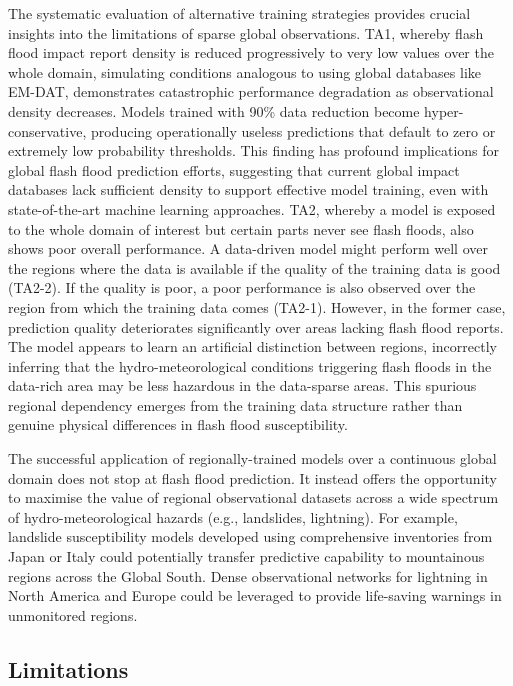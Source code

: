 The systematic evaluation of alternative training strategies provides crucial insights into the limitations of sparse global observations. TA1, whereby flash flood impact report density is reduced progressively to very low values over the whole domain, simulating conditions analogous to using global databases like EM-DAT, demonstrates catastrophic performance degradation as observational density decreases. Models trained with 90\% data reduction become hyper-conservative, producing operationally useless predictions that default to zero or extremely low probability thresholds. This finding has profound implications for global flash flood prediction efforts, suggesting that current global impact databases lack sufficient density to support effective model training, even with state-of-the-art machine learning approaches. TA2, whereby a model is exposed to the whole domain of interest but certain parts never see flash floods, also shows poor overall performance. A data-driven model might perform well over the regions where the data is available if the quality of the training data is good (TA2-2). If the quality is poor, a poor performance is also observed over the region from which the training data comes (TA2-1). However, in the former case, prediction quality deteriorates significantly over areas lacking flash flood reports. The model appears to learn an artificial distinction between regions, incorrectly inferring that the hydro-meteorological conditions triggering flash floods in the data-rich area may be less hazardous in the data-sparse areas. This spurious regional dependency emerges from the training data structure rather than genuine physical differences in flash flood susceptibility.

The successful application of regionally-trained models over a continuous global domain does not stop at flash flood prediction. It instead offers the opportunity to maximise the value of regional observational datasets across a wide spectrum of hydro-meteorological hazards (e.g., landslides, lightning). For example, landslide susceptibility models developed using comprehensive inventories from Japan or Italy could potentially transfer predictive capability to mountainous regions across the Global South. Dense observational networks for lightning in North America and Europe could be leveraged to provide life-saving warnings in unmonitored regions.  


\subsection{Limitations}

